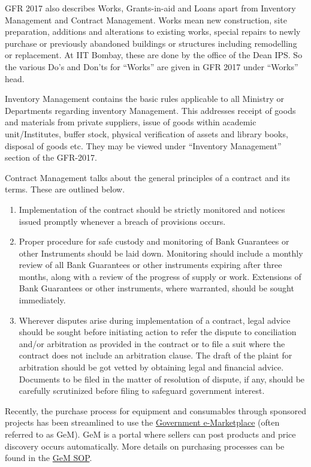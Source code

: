 \documentclass[
  10pt,
  a5paper,
  10pt,
  openany]{amsbook}
\begin{document}
GFR 2017 also describes Works, Grants-in-aid and Loans apart from
Inventory Management and Contract Management. Works mean new
construction, site preparation, additions and alterations to existing
works, special repairs to newly purchase or previously abandoned
buildings or structures including remodelling or replacement. At IIT
Bombay, these are done by the office of the Dean IPS. So the various
Do's and Don'ts for ``Works'' are given in GFR 2017 under ``Works''
head.

Inventory Management contains the basic rules applicable to all Ministry
or Departments regarding inventory Management. This addresses receipt of
goods and materials from private suppliers, issue of goods within
academic unit/Institutes, buffer stock, physical verification of assets
and library books, disposal of goods etc. They may be viewed under
``Inventory Management'' section of the GFR-2017.

Contract Management talks about the general principles of a contract and
its terms. These are outlined below.

\begin{enumerate}
\def\labelenumi{\arabic{enumi}.}
\item
  Implementation of the contract should be strictly monitored and
  notices issued promptly whenever a breach of provisions occurs.
\item
  Proper procedure for safe custody and monitoring of Bank Guarantees or
  other Instruments should be laid down. Monitoring should include a
  monthly review of all Bank Guarantees or other instruments expiring
  after three months, along with a review of the progress of supply or
  work. Extensions of Bank Guarantees or other instruments, where
  warranted, should be sought immediately.
\item
  Wherever disputes arise during implementation of a contract, legal
  advice should be sought before initiating action to refer the dispute
  to conciliation and/or arbitration as provided in the contract or to
  file a suit where the contract does not include an arbitration clause.
  The draft of the plaint for arbitration should be got vetted by
  obtaining legal and financial advice. Documents to be filed in the
  matter of resolution of dispute, if any, should be carefully
  scrutinized before filing to safeguard government interest.
\end{enumerate}

Recently, the purchase process for equipment and consumables through
sponsored projects has been streamlined to use the
\href{https://gem.gov.in/}{Government e-Marketplace} (often referred to
as GeM). GeM is a portal where sellers can post products and price
discovery occurs automatically. More details on purchasing processes can
be found in the
\href{https://bighome.iitb.ac.in/index.php/s/4nzdNMMmsXECqyD}{GeM SOP}.
\end{document}
